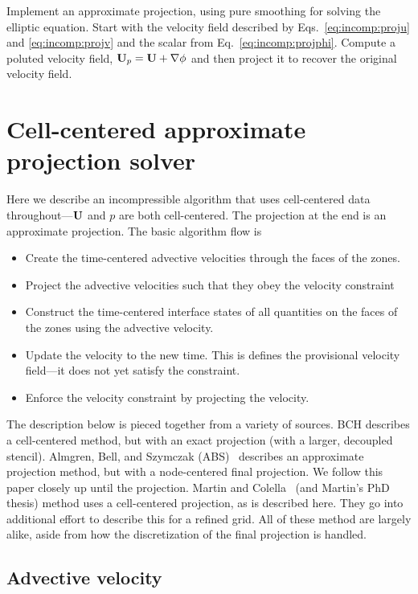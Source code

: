 \begin{exercise}
Implement an approximate projection, using pure smoothing for solving
the elliptic equation.  Start with the velocity field described
by Eqs.~\ref{eq:incomp:proju} and \ref{eq:incomp:projv} and the scalar
from Eq.~\ref{eq:incomp:projphi}.  Compute a poluted velocity field,
${\bf U}_p = {\bf U} + \nabla \phi$ and then project it to recover the 
original velocity field.
\end{exercise}

\section{Cell-centered approximate projection solver}

Here we describe an incompressible algorithm that uses cell-centered
data throughout---${\bf U}$ and $p$ are both cell-centered.  The
projection at the end is an approximate projection.  The basic
algorithm flow is 
\begin{itemize}
\item Create the time-centered advective velocities through the faces
  of the zones.
\item Project the advective velocities such that they obey the
  velocity constraint
\item Construct the time-centered interface states of all quantities
  on the faces of the zones using the advective velocity.
\item Update the velocity to the new time.  This is defines the
  provisional velocity field---it does not yet satisfy the constraint.
\item Enforce the velocity constraint by projecting the velocity.
\end{itemize}

The description below is pieced together from a variety of sources.
BCH describes a cell-centered method, but with an exact projection
(with a larger, decoupled stencil).  Almgren, Bell, and Szymczak
(ABS)~\cite{ABS} describes an approximate projection method, but with
a node-centered final projection.  We follow this paper closely up
until the projection.  Martin and Colella~\cite{MartinColella} (and
Martin's PhD thesis) method uses a cell-centered projection, as is
described here.  They go into additional effort to describe this for a
refined grid.  All of these method are largely alike, aside from how
the discretization of the final projection is handled.

\subsection{Advective velocity}

